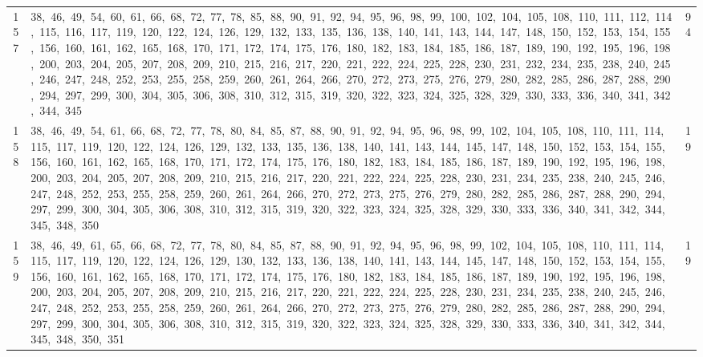 \begin{longtable}{c|p{}|r}
157 & 38,\ 46,\ 49,\ 54,\ 60,\ 61,\ 66,\ 68,\ 72,\ 77,\ 78,\ 85,\ 88,\ 90,\ 91,\ 92,\ 94,\ 95,\ 96,\ 98,\ 99,\ 100,\ 102,\ 104,\ 105,\ 108,\ 110,\ 111,\ 112,\ 114,\ 115,\ 116,\ 117,\ 119,\ 120,\ 122,\ 124,\ 126,\ 129,\ 132,\ 133,\ 135,\ 136,\ 138,\ 140,\ 141,\ 143,\ 144,\ 147,\ 148,\ 150,\ 152,\ 153,\ 154,\ 155,\ 156,\ 160,\ 161,\ 162,\ 165,\ 168,\ 170,\ 171,\ 172,\ 174,\ 175,\ 176,\ 180,\ 182,\ 183,\ 184,\ 185,\ 186,\ 187,\ 189,\ 190,\ 192,\ 195,\ 196,\ 198,\ 200,\ 203,\ 204,\ 205,\ 207,\ 208,\ 209,\ 210,\ 215,\ 216,\ 217,\ 220,\ 221,\ 222,\ 224,\ 225,\ 228,\ 230,\ 231,\ 232,\ 234,\ 235,\ 238,\ 240,\ 245,\ 246,\ 247,\ 248,\ 252,\ 253,\ 255,\ 258,\ 259,\ 260,\ 261,\ 264,\ 266,\ 270,\ 272,\ 273,\ 275,\ 276,\ 279,\ 280,\ 282,\ 285,\ 286,\ 287,\ 288,\ 290,\ 294,\ 297,\ 299,\ 300,\ 304,\ 305,\ 306,\ 308,\ 310,\ 312,\ 315,\ 319,\ 320,\ 322,\ 323,\ 324,\ 325,\ 328,\ 329,\ 330,\ 333,\ 336,\ 340,\ 341,\ 342,\ 344,\ 345 & 94 \\
158 & 38,\ 46,\ 49,\ 54,\ 61,\ 66,\ 68,\ 72,\ 77,\ 78,\ 80,\ 84,\ 85,\ 87,\ 88,\ 90,\ 91,\ 92,\ 94,\ 95,\ 96,\ 98,\ 99,\ 102,\ 104,\ 105,\ 108,\ 110,\ 111,\ 114,\ 115,\ 117,\ 119,\ 120,\ 122,\ 124,\ 126,\ 129,\ 132,\ 133,\ 135,\ 136,\ 138,\ 140,\ 141,\ 143,\ 144,\ 145,\ 147,\ 148,\ 150,\ 152,\ 153,\ 154,\ 155,\ 156,\ 160,\ 161,\ 162,\ 165,\ 168,\ 170,\ 171,\ 172,\ 174,\ 175,\ 176,\ 180,\ 182,\ 183,\ 184,\ 185,\ 186,\ 187,\ 189,\ 190,\ 192,\ 195,\ 196,\ 198,\ 200,\ 203,\ 204,\ 205,\ 207,\ 208,\ 209,\ 210,\ 215,\ 216,\ 217,\ 220,\ 221,\ 222,\ 224,\ 225,\ 228,\ 230,\ 231,\ 234,\ 235,\ 238,\ 240,\ 245,\ 246,\ 247,\ 248,\ 252,\ 253,\ 255,\ 258,\ 259,\ 260,\ 261,\ 264,\ 266,\ 270,\ 272,\ 273,\ 275,\ 276,\ 279,\ 280,\ 282,\ 285,\ 286,\ 287,\ 288,\ 290,\ 294,\ 297,\ 299,\ 300,\ 304,\ 305,\ 306,\ 308,\ 310,\ 312,\ 315,\ 319,\ 320,\ 322,\ 323,\ 324,\ 325,\ 328,\ 329,\ 330,\ 333,\ 336,\ 340,\ 341,\ 342,\ 344,\ 345,\ 348,\ 350 & 19 \\
159 & 38,\ 46,\ 49,\ 61,\ 65,\ 66,\ 68,\ 72,\ 77,\ 78,\ 80,\ 84,\ 85,\ 87,\ 88,\ 90,\ 91,\ 92,\ 94,\ 95,\ 96,\ 98,\ 99,\ 102,\ 104,\ 105,\ 108,\ 110,\ 111,\ 114,\ 115,\ 117,\ 119,\ 120,\ 122,\ 124,\ 126,\ 129,\ 130,\ 132,\ 133,\ 136,\ 138,\ 140,\ 141,\ 143,\ 144,\ 145,\ 147,\ 148,\ 150,\ 152,\ 153,\ 154,\ 155,\ 156,\ 160,\ 161,\ 162,\ 165,\ 168,\ 170,\ 171,\ 172,\ 174,\ 175,\ 176,\ 180,\ 182,\ 183,\ 184,\ 185,\ 186,\ 187,\ 189,\ 190,\ 192,\ 195,\ 196,\ 198,\ 200,\ 203,\ 204,\ 205,\ 207,\ 208,\ 209,\ 210,\ 215,\ 216,\ 217,\ 220,\ 221,\ 222,\ 224,\ 225,\ 228,\ 230,\ 231,\ 234,\ 235,\ 238,\ 240,\ 245,\ 246,\ 247,\ 248,\ 252,\ 253,\ 255,\ 258,\ 259,\ 260,\ 261,\ 264,\ 266,\ 270,\ 272,\ 273,\ 275,\ 276,\ 279,\ 280,\ 282,\ 285,\ 286,\ 287,\ 288,\ 290,\ 294,\ 297,\ 299,\ 300,\ 304,\ 305,\ 306,\ 308,\ 310,\ 312,\ 315,\ 319,\ 320,\ 322,\ 323,\ 324,\ 325,\ 328,\ 329,\ 330,\ 333,\ 336,\ 340,\ 341,\ 342,\ 344,\ 345,\ 348,\ 350,\ 351 & 19 \\

\end{longtable}
